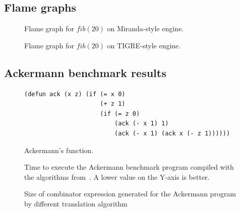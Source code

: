 \documentclass[conference]{IEEEtran}
\DeclareMathOperator{\strict}{strict}
\DeclareMathOperator{\lazy}{lazy}
\DeclareMathOperator{\lazyeta}{lazy_\eta}
\DeclareMathOperator{\linear}{linear}
\begin{document}




\appendix

\subsection{Flame graphs}
\label{app:flame-graph}
\begin{figure}
    
    \centering
    \caption{Flame graph for $fib(20)$ on Miranda-style engine.}
    \label{fig:flamegraph-turner}
\end{figure}

\begin{figure}
    
    \centering
    \caption{Flame graph for $fib(20)$ on TIGRE-style engine.}
    \label{fig:flamegraph-tigre}
\end{figure}

\newpage

\subsection{Ackermann benchmark results}
\label{app:ack}

\begin{figure}
    \begin{lstlisting}
(defun ack (x z) (if (= x 0)
                     (+ z 1)
                     (if (= z 0)
                         (ack (- x 1) 1)
                         (ack (- x 1) (ack x (- z 1))))))
    \end{lstlisting}
    \centering
    \caption{
        Ackermann's function.
    }
    \label{fig:ack}
\end{figure}


\begin{figure}
    
    \centering
    \caption{Time to execute the Ackermann benchmark program compiled with the algorithms from~\cite{kiselyov_lambda_2018}. A lower value on the Y-axis is better.}
    \label{fig:ack-bracket-vs-kiselyov}
\end{figure}

\begin{figure}
    \centering
    \caption{Size of combinator expression generated for the Ackermann program by different translation algorithm}
    \label{fig:ack-sizes}
\end{figure}
\end{document}

